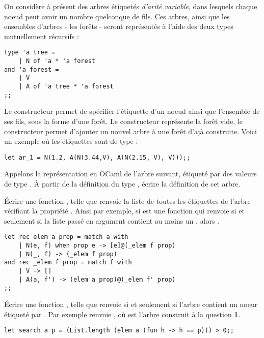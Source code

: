 \documentclass{report}
\begin{document}
\begin{exo}
    On considère à présent des arbres étiquetés \textit{d'arité variable}, dans lesquels
    chaque noeud peut avoir un nombre quelconque de fils. Ces arbres, ainsi que les
    ensembles d'arbres - les forêts - seront représentés à l'aide des deux types
    mutuellement récursifs :
    \begin{lstlisting}
type 'a tree =
    | N of 'a * 'a forest
and 'a forest =
    | V
    | A of 'a tree * 'a forest
;;  \end{lstlisting}
    Le constructeur  permet de spécifier l'étiquette d'un noeud ainsi que
    l'ensemble de ses fils, sous la forme d'une forêt. Le constructeur 
    représente la forêt vide, le constructeur  permet d'ajouter un nouvel
    arbre à une forêt d'ajà construite. Voici un exemple où les étiquettes sont de type
    :
    \begin{lstlisting}
let ar_1 = N(1.2, A(N(3.44,V), A(N(2.15, V), V)));;\end{lstlisting}
    \begin{q}{1}
        Appelons  la représentation en OCaml de l'arbre suivant, étiqueté par
        des valeurs de type . À partir de la définition du type
        , écrire la définition de cet arbre.
    \end{q}
    \begin{q}{2}
        Écrire une fonction , telle
        que  renvoie la liste de toutes les étiquettes de l'arbre
         vérifiant la propriété . Ainsi par exemple, si
         est une fonction qui renvoie 
        si et seulement si la liste passé en argument contient au moins un ,
        alors .
        \begin{lstlisting}
let rec elem a prop = match a with
    | N(e, f) when prop e -> [e]@(_elem f prop)
    | N(_, f) -> (_elem f prop)
and rec _elem f prop = match f with
    | V -> []
    | A(a, f') -> (elem a prop)@(_elem f' prop)
;;      \end{lstlisting}
    \end{q}
    \begin{q}{3}
        Écrire une fonction , telle que
         renvoie  si et seulement si l'arbre
         contient un noeur étiqueté par . Par exemple
         renvoie , où 
        est l'arbre construit à la question \textbf{1}.
        \begin{lstlisting}
let search a p = (List.length (elem a (fun h -> h == p))) > 0;;\end{lstlisting}
    \end{q}
\end{exo}
\end{document}
